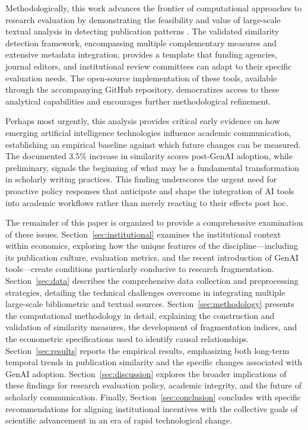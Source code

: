 \documentclass[12pt]{article}
\begin{document}
Methodologically, this work advances the frontier of computational approaches to research evaluation by demonstrating the feasibility and value of large-scale textual analysis in detecting publication patterns \citep{roberts2019content, davidson2021mapping, liu2021similarity, fortunato2018science}. The validated similarity detection framework, encompassing multiple complementary measures and extensive metadata integration, provides a template that funding agencies, journal editors, and institutional review committees can adapt to their specific evaluation needs. The open-source implementation of these tools, available through the accompanying GitHub repository, democratizes access to these analytical capabilities and encourages further methodological refinement.

Perhaps most urgently, this analysis provides critical early evidence on how emerging artificial intelligence technologies influence academic communication, establishing an empirical baseline against which future changes can be measured. The documented 3.5\% increase in similarity scores post-GenAI adoption, while preliminary, signals the beginning of what may be a fundamental transformation in scholarly writing practices. This finding underscores the urgent need for proactive policy responses that anticipate and shape the integration of AI tools into academic workflows rather than merely reacting to their effects post hoc.

The remainder of this paper is organized to provide a comprehensive examination of these issues. Section~\ref{sec:institutional} examines the institutional context within economics, exploring how the unique features of the discipline—including its publication culture, evaluation metrics, and the recent introduction of GenAI tools—create conditions particularly conducive to research fragmentation. Section~\ref{sec:data} describes the comprehensive data collection and preprocessing strategies, detailing the technical challenges overcome in integrating multiple large-scale bibliometric and textual sources. Section~\ref{sec:methodology} presents the computational methodology in detail, explaining the construction and validation of similarity measures, the development of fragmentation indices, and the econometric specifications used to identify causal relationships. Section~\ref{sec:results} reports the empirical results, emphasizing both long-term temporal trends in publication similarity and the specific changes associated with GenAI adoption. Section~\ref{sec:discussion} explores the broader implications of these findings for research evaluation policy, academic integrity, and the future of scholarly communication. Finally, Section~\ref{sec:conclusion} concludes with specific recommendations for aligning institutional incentives with the collective goals of scientific advancement in an era of rapid technological change.
\end{document}
